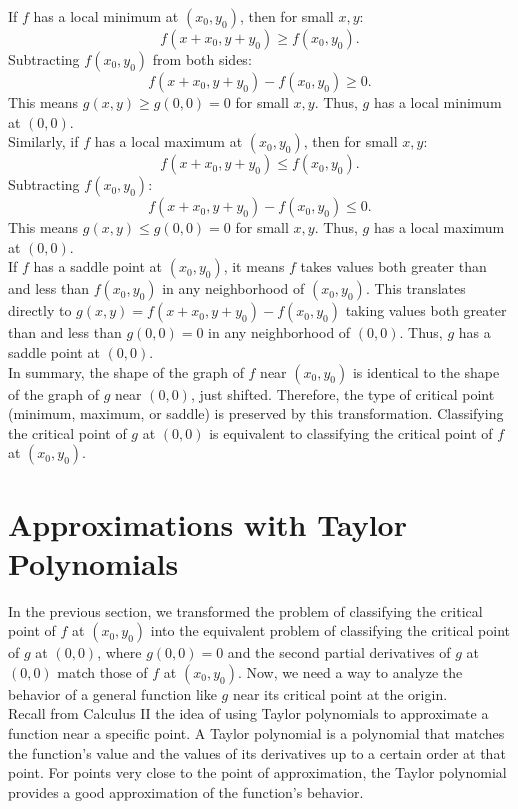 \documentclass{article}
\begin{document}
If \( f \) has a local minimum at \( (x_0, y_0) \), then for small \( x,y \):
\[
	f(x+x_0, y+y_0) \geq f(x_0, y_0).
\]
Subtracting \( f(x_0, y_0) \) from both sides:
\[
	f(x+x_0, y+y_0) - f(x_0, y_0) \geq 0.
\]
This means \( g(x,y) \geq g(0,0) = 0 \) for small \( x,y \). Thus, \( g \) has a local minimum at \( (0,0) \). \\

Similarly, if \( f \) has a local maximum at \( (x_0, y_0) \), then for small \( x,y \):
\[
	f(x+x_0, y+y_0) \leq f(x_0, y_0).
\]
Subtracting \( f(x_0, y_0) \):
\[
	f(x+x_0, y+y_0) - f(x_0, y_0) \leq 0.
\]
This means \( g(x,y) \leq g(0,0) = 0 \) for small \( x,y \). Thus, \( g \) has a local maximum at \( (0,0) \). \\

If \( f \) has a saddle point at \( (x_0, y_0) \), it means \( f \) takes values both greater than and less than \( f(x_0, y_0) \) in any neighborhood of \( (x_0, y_0) \). This translates directly to \( g(x,y) = f(x+x_0, y+y_0) - f(x_0, y_0) \) taking values both greater than and less than \( g(0,0) = 0 \) in any neighborhood of \( (0,0) \). Thus, \( g \) has a saddle point at \( (0,0) \). \\

In summary, the shape of the graph of \( f \) near \( (x_0, y_0) \) is identical to the shape of the graph of \( g \) near \( (0,0) \), just shifted. Therefore, the type of critical point (minimum, maximum, or saddle) is preserved by this transformation. Classifying the critical point of \( g \) at \( (0,0) \) is equivalent to classifying the critical point of \( f \) at \( (x_0,y_0) \). 

\section{Approximations with Taylor Polynomials}

In the previous section, we transformed the problem of classifying the critical point of \( f \) at \( (x_0, y_0) \) into the equivalent problem of classifying the critical point of \( g \) at \( (0,0) \), where \( g(0,0)=0 \) and the second partial derivatives of \( g \) at \( (0,0) \) match those of \( f \) at \( (x_0, y_0) \). Now, we need a way to analyze the behavior of a general function like \( g \) near its critical point at the origin. \\

Recall from Calculus II the idea of using Taylor polynomials to approximate a function near a specific point. A Taylor polynomial is a polynomial that matches the function's value and the values of its derivatives up to a certain order at that point. For points very close to the point of approximation, the Taylor polynomial provides a good approximation of the function's behavior. \\
\end{document}
